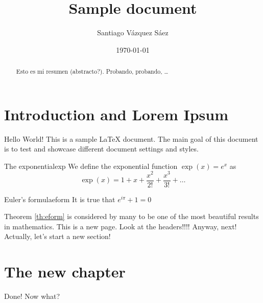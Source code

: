 \documentclass[twoside]{report}
\begin{document}

\title{Sample document}
\author{Santiago Vázquez Sáez}
\date{\today}
\maketitle

\begin{abstract}
	Esto es mi resumen (abstracto?). Probando, probando, \ldots
\end{abstract}

\tableofcontents
\cleardoublepage


\chapter{Introduction and Lorem Ipsum}

Hello World!
This is a sample {\LaTeX} document. The main goal of this document is to test and showcase different document settings and styles.

\blindtext
\begin{definition}{The exponential}{exp}
	We define the exponential function $\exp (x)=e^x$ as
	\[
		\exp(x) = 1+x+\frac{x^2}{2!}+\frac{x^3}{3!}+\dots
	\]
\end{definition}
\begin{theorem}{Euler's formula}{eform}
	It is true that $e^{i\pi}+1=0$
\end{theorem}

Theorem \ref{th:eform} is considered by many to be one of the most beautiful results in mathematics.
\newpage
This is a new page. Look at the headers!!!! Anyway, next!
\newpage
Actually, let's start a new section!

\chapter{The new chapter}
Done! Now what?
\end{document}
